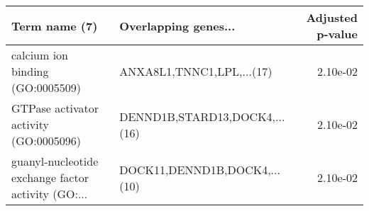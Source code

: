 \begin{tabular}{llr}
\toprule
                                     Term name (7) &          Overlapping genes... &  Adjusted p-value \\
\midrule
                  calcium ion binding (GO:0005509) &     ANXA8L1,TNNC1,LPL,...(17) &          2.10e-02 \\
            GTPase activator activity (GO:0005096) & DENND1B,STARD13,DOCK4,...(16) &          2.10e-02 \\
guanyl-nucleotide exchange factor activity (GO:... &  DOCK11,DENND1B,DOCK4,...(10) &          2.10e-02 \\
\bottomrule
\end{tabular}
